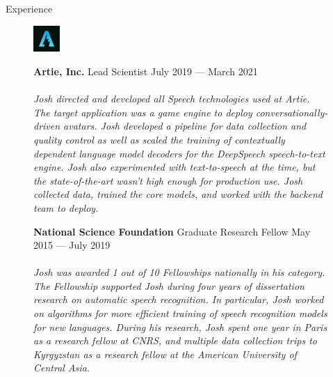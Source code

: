\documentclass{resume} %
\begin{document}
\begin{rSection}{Experience}
  \begin{figure}[H]
    \begin{minipage}{0.2\textwidth}
      \centering
      \includegraphics[width=1cm]{imgs/artie-logo-small.jpeg}
    \end{minipage}
    \begin{minipage}{0.8\textwidth}
      {\bf Artie, Inc.} \hfill Lead Scientist \hfill {July 2019 --- March 2021} \\ \\
      \textit{Josh directed and developed all Speech technologies used at Artie. The target application was a game engine to deploy conversationally-driven avatars. Josh developed a pipeline for data collection and quality control as well as scaled the training of contextually dependent language model decoders for the DeepSpeech speech-to-text engine. Josh also experimented with text-to-speech at the time, but the state-of-the-art wasn't high enough for production use. Josh collected data, trained the core models, and worked with the backend team to deploy.} \\
    \end{minipage}
  \end{figure}

  \begin{figure}[H]
    \begin{minipage}{0.2\textwidth}
      \centering
      
    \end{minipage}
    \begin{minipage}{0.8\textwidth}
      {\bf National Science Foundation} \hfill Graduate Research Fellow \hfill {May 2015 --- July 2019} \\ \\
      \textit{Josh was awarded 1 out of 10 Fellowships nationally in his category. The Fellowship supported Josh during four years of dissertation research on automatic speech recognition. In particular, Josh worked on algorithms for more efficient training of speech recognition models for new languages. During his research, Josh spent one year in Paris as a research fellow at CNRS, and multiple data collection trips to Kyrgyzstan as a research fellow at the American University of Central Asia.} \\
    \end{minipage}
  \end{figure}


\end{rSection}
\end{document}
